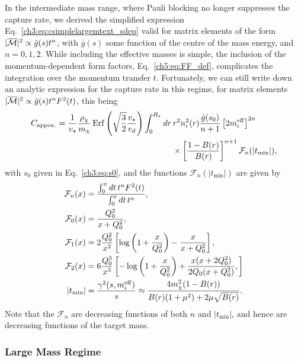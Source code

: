 In the intermediate mass range, where Pauli blocking no longer suppresses the capture rate, we derived the simplified expression Eq.~\ref{ch3:eq:csimplelargemtext_sdep} valid for matrix elements of the form $|\overline{\mathcal M}|^2 \propto \bar{g}(s) t^n$, with $\bar{g}(s)$ some function of the centre of the mass energy, and $n = 0, 1, 2$. While including the effective masses is simple, the inclusion of the momentum-dependent form factors, Eq.~\ref{ch5:eq:FF_def}, complicates the integration over the momentum transfer $t$. Fortunately, we can still write down an analytic expression for the capture rate in this regime, for matrix elements $|\overline{\mathcal M}|^2 \propto \bar{g}(s) t^n F^2(t)$, this being
\begin{equation}
   \begin{split}
      C_\mathrm{appox.} &= \frac{1}{\vstar} \frac{\rho_\chi}{\mchi}\erf\left(\sqrt{\frac{3}{2}}\frac{\vstar}{v_d}\right)\int_0^{\Rstar}dr\,r^2n_i^2(r) \frac{\bar{g}(s_0)}{n+1}\left[2 \mbeff\right]^{2n} \\
      & \hspace{14em}\times\left[\frac{1 - B(r)}{B(r)}\right]^{n+1} \mathcal{F}_n(|t_\mathrm{min}|),
   \end{split}
   \label{ch5:eq:capture_simple}
\end{equation}
with $s_0$ given in Eq.~\ref{ch3:eq:s0}, and the functions $\mathcal{F}_n(|t_\mathrm{min}|)$ are given by
\begin{align}
   \mathcal{F}_n(x) & = \frac{\int_0^x dt\,t^n F^2(t)}{\int_0^x dt\,t^n},\\
   \mathcal{F}_0(x) & = \frac{Q_0^2}{x + Q_0^2},\\
   \mathcal{F}_1(x) & = 2\frac{Q_0^2}{x^2} \left[\log\left(1 + \frac{x}{Q_0^2}\right) - \frac{x}{x + Q_0^2 }\right],\\
   \mathcal{F}_2(x) & = 6 \frac{Q_0^3}{x^3}\left[ -\log\left(1 + \frac{x}{Q_0^2}\right) + \frac{x (x + 2Q_0^2)}{2 Q_0(x + Q_0^2)} ,\right]\\
   |t_\mathrm{min}| & = \frac{\gamma^2(s, m_i^{\rm eff})}{s} \approx\frac{4 m_\chi^2( 1 - B(r))}{B(r)(1 + \mu^2) + 2 \mu\sqrt{B(r)}}.
\end{align}
Note that the $\mathcal{F}_n$ are decreasing functions of both $n$ and $|t_\mathrm{min}|$, and hence are decreasing functions of the target mass.

\subsubsection{Large Mass Regime}



